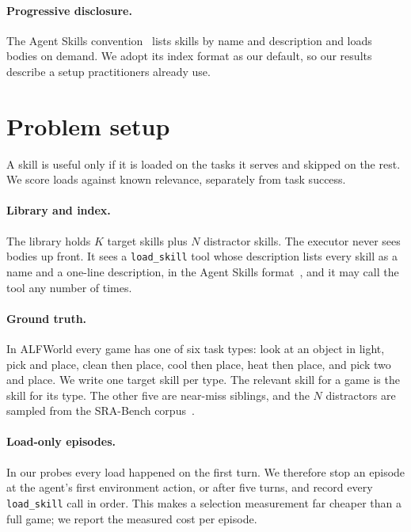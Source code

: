 \documentclass[11pt]{article}
\newcommand{\code}[1]{\texttt{#1}}
\begin{document}
\paragraph{Progressive disclosure.} The Agent Skills convention~\cite{anthropic2025overview,anthropic2025engineering} lists skills by name and description and loads bodies on demand. We adopt its index format as our default, so our results describe a setup practitioners already use.

\section{Problem setup}
\label{sec:setup}

A skill is useful only if it is loaded on the tasks it serves and skipped on the rest. We score loads against known relevance, separately from task success.

\paragraph{Library and index.} The library holds $K$ target skills plus $N$ distractor skills. The executor never sees bodies up front. It sees a \code{load\_skill} tool whose description lists every skill as a name and a one-line description, in the Agent Skills format~\cite{anthropic2025overview,anthropic2025engineering}, and it may call the tool any number of times.

\paragraph{Ground truth.} In ALFWorld every game has one of six task types: look at an object in light, pick and place, clean then place, cool then place, heat then place, and pick two and place. We write one target skill per type. The relevant skill for a game is the skill for its type. The other five are near-miss siblings, and the $N$ distractors are sampled from the SRA-Bench corpus~\cite{su2026sra}.

\paragraph{Load-only episodes.} In our probes every load happened on the first turn. We therefore stop an episode at the agent's first environment action, or after five turns, and record every \code{load\_skill} call in order. This makes a selection measurement far cheaper than a full game; we report the measured cost per episode.
\end{document}
